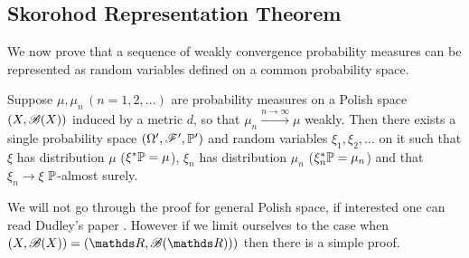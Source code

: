 \subsection{Skorohod Representation Theorem}
We now prove that a sequence of weakly convergence probability measures can be represented as random variables defined on a common probability space.

\begin{theorem}
Suppose $\mu, \mu_n \, (n=1,2,...)$ are probability measures on a Polish space $(X,\mathcal{B}(X))$ induced by a metric $d$, so that $\mu_n \overset{n\to \infty}{\to} \mu$ weakly. Then there exists a single probability space $(\Omega', \mathcal{F}', \mathbb{P}')$ and random variables $\xi_1, \xi_2, \dots$ on it such that $\xi$ has distribution $\mu$ ($\xi^*\mathbb{P} = \mu$), $\xi_n$ has distribution $\mu_n$ ($\xi_n^*\mathbb{P} = \mu_n$) and that $\xi_n \to \xi$ $\mathbb{P}$-almost surely.
\end{theorem}

We will not go through the proof for general Polish space, if interested one can read Dudley's paper \cite{DudleySkorohod}. However if we limit ourselves to the case when $(X,\B(X)) = (\R, \B(\R)))$ then there is a simple proof.

